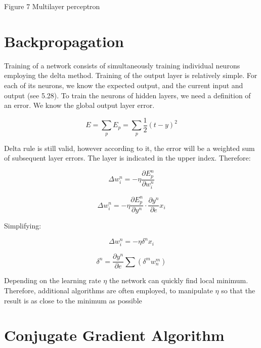 \documentclass[10pt,oneside]{memoir}
\begin{document}
Figure 7 Multilayer perceptron


\section{Backpropagation}
\label{backpropagation}

Training of a network consists of simultaneously training individual neurons employing the delta method. Training of the output layer is relatively simple. For each of its neurons, we know the expected output, and the current input and output (see 5.28).
To train the neurons of hidden layers, we need a definition of an error. We know the global output layer error.


\begin{equation}
E=\sum _{p}{E}_{p}=\sum _{p}\frac{1}{2}{(t-y)}^{2}
\end{equation}


Delta rule is still valid, however according to it, the error will be a weighted sum of subsequent layer errors. The layer is indicated in the upper index. Therefore:


\begin{equation}
\Delta {w}_{i}^{n}=-\eta \frac{\partial {E}_{p}^{n}}{\partial {w}_{i}^{n}}
\end{equation}


\begin{equation}
\Delta {w}_{i}^{n}=-\eta \frac{\partial {E}_{p}^{n}}{\partial {y}^{n}}\cdot \frac{\partial {y}^{n}}{\partial e}{x}_{i}
\end{equation}


Simplifying:


\begin{equation}
\Delta {w}_{i}^{n}=-\eta {\delta }^{n}{x}_{i}
\end{equation}


\begin{equation}
{\delta }^{n}=\frac{\partial {y}^{n}}{\partial e}\sum \left({\delta }^{m}{w}_{n}^{m}\right)
\end{equation}


Depending on the learning rate $ \eta $ the network can quickly find local minimum. Therefore, additional algorithms are often employed, to manipulate $ \eta $ so that the result is as close to the minimum as possible


\section{Conjugate Gradient Algorithm}
\label{conjugategradientalgorithm}
\end{document}
